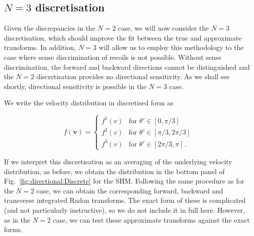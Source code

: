 

\subsection{$N=3$ discretisation}

Given the discrepancies in the $N=2$ case, we will now consider the $N=3$ discretisation, which should improve the fit between the true and approximate transforms. In addition, $N=3$ will allow us to employ this methodology to the case where sense discrimination of recoils is not possible. Without sense discrimination, the forward and backward directions cannot be distinguished and the $N=2$ discretisation provides no directional sensitivity. As we shall see shortly, directional sensitivity is possible in the $N=3$ case.

We write the velocity distribution in discretised form as

\begin{equation}
\label{eq:directional:N3}
f(\mathbf{v}) =
\begin{cases}
f^1(v) & \textrm{for } \theta' \in [0, \pi/3] \\
f^2(v) & \textrm{for } \theta' \in [\pi/3, 2\pi/3] \\
f^3(v) & \textrm{for } \theta' \in [2\pi/3, \pi]\,.
\end{cases}
\end{equation}

If we interpret this discretisation as an averaging of the underlying velocity distribution, as before, we obtain the distribution in the bottom panel of Fig.~\ref{fig:directional:Discrete} for the SHM. Following the same procedure as for the $N=2$ case, we can obtain the corresponding forward, backward and transverse integrated Radon transforms. The exact form of these is complicated (and not particularly instructive), so we do not include it in full here. However, as in the $N=2$ case, we can test these approximate transforms against the exact forms.

